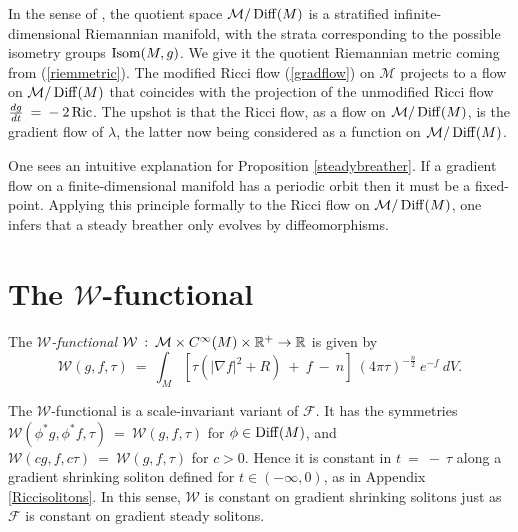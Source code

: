 In the sense of  \cite{Bourguignon}, the quotient space ${\mathcal M}/\operatorname{Diff}(M)$
is a stratified
infinite-dimensional Riemannian manifold, with the strata corresponding
to the possible isometry groups $\operatorname{Isom}(M, g)$.
We give it the quotient Riemannian metric coming from
(\ref{riemmetric}).
The modified Ricci flow (\ref{gradflow}) on
${\mathcal M}$ projects to a flow on ${\mathcal M}/\operatorname{Diff}(M)$
that coincides with the projection of the unmodified Ricci flow
$\frac{dg}{dt} \: = \: - \: 2 \operatorname{Ric}$. The upshot is that  the
Ricci flow, as a flow on ${\mathcal M}/\operatorname{Diff}(M)$, is the gradient flow of
$\lambda$, the latter now being considered as a function on
${\mathcal M}/\operatorname{Diff}(M)$.

One sees an intuitive explanation for Proposition \ref{steadybreather}.
If a gradient flow on a finite-dimensional manifold has a periodic
orbit then it must be a fixed-point.  Applying this principle formally
to the Ricci flow on ${\mathcal M}/\operatorname{Diff}(M)$, one infers that a steady
breather only evolves by diffeomorphisms.

\section{The ${\mathcal W}$-functional}
\label{Basic Example for Section 3.1}

\begin{definition}
  \label{def:kl-w-entropy-w-entropy-definition}

The {\em ${\mathcal W}$-functional} ${\mathcal W} \: : \: {\mathcal M} \times C^\infty(M) \times
{\mathbb R}^+ \rightarrow {\mathbb R}$ is given by
\begin{equation}
{\mathcal W}(g, f, \tau) \: = \: \int_M \left[ \tau \left(
|\nabla f|^2 + R \right) \: + \: f \: - \: n \right] \:
(4\pi \tau)^{-\frac{n}{2}} \: e^{-f} \: dV.
\end{equation}
\end{definition}

The ${\mathcal W}$-functional
is a scale-invariant variant of ${\mathcal F}$. It
has the symmetries ${\mathcal W}(\phi^* g, \phi^* f, \tau) \: = \:
{\mathcal W}(g, f, \tau)$ for $\phi \in \operatorname{Diff}(M)$, and
${\mathcal W}(cg, f, c\tau) \: = \: {\mathcal W}(g, f, \tau)$
for $c > 0$. Hence it is constant in $t \: = \: - \: \tau$ along
a gradient shrinking soliton defined for $t \in (-\infty, 0)$,
as in Appendix \ref{Riccisolitons}. In this sense, ${\mathcal W}$ is
constant on gradient shrinking solitons just as ${\mathcal F}$ is
constant on gradient steady solitons.

